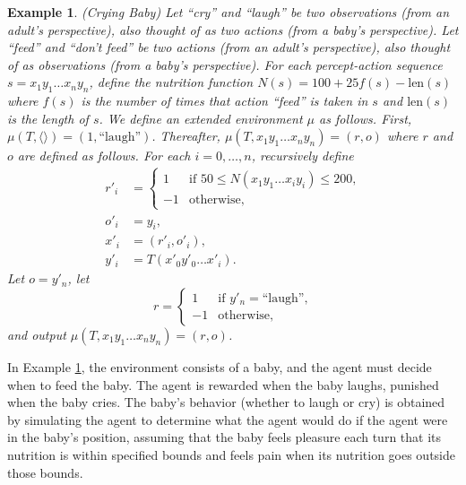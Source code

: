 \documentclass{article}
\newtheorem{myexample}[mytheorem]{Example}
\begin{document}
\begin{myexample}
\label{cryingbabyexample}
  (Crying Baby)
  Let ``cry'' and ``laugh'' be two observations (from an adult's perspective),
  also thought of as two actions (from a baby's perspective).
  Let ``feed'' and ``don't feed'' be two actions (from an adult's perspective),
  also thought of as observations (from a baby's perspective).
  For each percept-action sequence $s=x_1y_1\ldots x_ny_n$, define the
  nutrition function $N(s)=100+25f(s)-\mbox{len}(s)$ where $f(s)$ is the number
  of times that action ``feed'' is taken in $s$ and $\mbox{len}(s)$ is the length of $s$.
  We define an extended environment $\mu$ as follows.
  First, $\mu(T,\langle\rangle)=(1,\mbox{``laugh''})$.
  Thereafter, $\mu(T,x_1y_1\ldots x_ny_n)=(r,o)$ where $r$ and $o$ are defined as follows.
  For each $i=0,\ldots,n$, recursively define
  \begin{align*}
    r'_i &=
      \begin{cases}
        1 & \mbox{if $50 \leq N(x_1y_1\ldots x_iy_i)\leq 200$,}\\
        -1 & \mbox{otherwise,}
      \end{cases}\\
    o'_i &= y_i,\\
    x'_i &= (r'_i,o'_i),\\
    y'_i &= T(x'_0y'_0 \ldots x'_i).
  \end{align*}
  Let $o=y'_n$, let
  \[
    r=
      \begin{cases}
        1 & \mbox{if $y'_n=\mbox{``laugh''}$,}\\
        -1 & \mbox{otherwise,}
      \end{cases}
  \]
  and output $\mu(T,x_1y_1\ldots x_ny_n)=(r,o)$.
\end{myexample}

In Example \ref{cryingbabyexample}, the environment consists of a baby, and the
agent must decide when to feed the baby. The agent is rewarded when the baby laughs,
punished when the baby cries. The baby's behavior (whether to laugh or cry) is obtained
by simulating the agent to determine what the agent would do if the agent were in the
baby's position, assuming that the baby feels pleasure each turn that its nutrition is
within specified bounds and feels pain when its nutrition goes outside those bounds.
\end{document}
